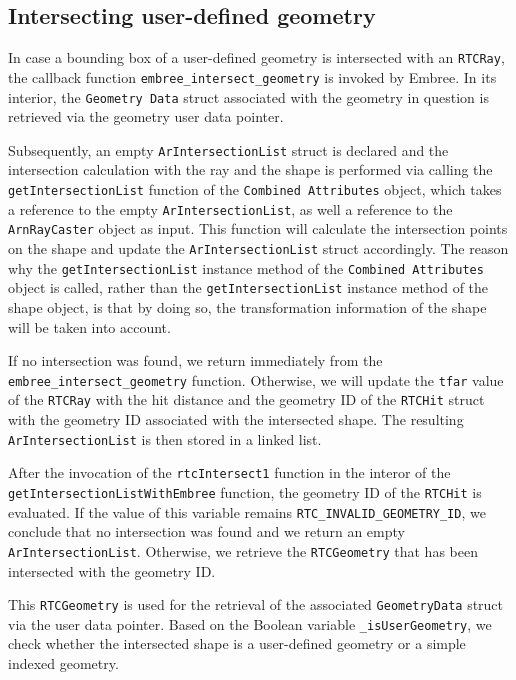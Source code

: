 \subsection{Intersecting user-defined geometry}
\label{subsec:instersect}

In case a bounding box of a user-defined geometry is intersected with an \texttt{RTCRay}, the callback function \texttt{embree\_intersect\_geometry} is invoked by Embree. In its interior, the \texttt{Geometry Data} struct associated with the geometry in question is retrieved via the geometry user data pointer. 

Subsequently, an empty \texttt{ArIntersectionList} struct is declared and the intersection calculation with the ray and the shape is performed via calling the \texttt{getIntersectionList} function of the \texttt{Combined Attributes} object, which takes a reference to the empty \texttt{ArIntersectionList}, as well a reference to the \texttt{ArnRayCaster} object as input.
This function will calculate the intersection points on the shape and update the \texttt{ArIntersectionList} struct accordingly. The reason why the \texttt{getIntersectionList} instance method of the \texttt{Combined Attributes} object is called, rather than the \texttt{getIntersectionList} instance method of the shape object, is that by doing so, the transformation information of the shape will be taken into account.

If no intersection was found, we return immediately from the \texttt{embree\_intersect\_geometry} function. Otherwise, we will update the \texttt{tfar} value of the \texttt{RTCRay} with the hit distance and the geometry ID of the \texttt{RTCHit} struct with the geometry ID associated with the intersected shape.
The resulting \texttt{ArIntersectionList} is then stored in a linked list.

After the invocation of the \texttt{rtcIntersect1} function in the interor of the  \texttt{getIntersectionListWithEmbree} function, the geometry ID of the \texttt{RTCHit} is evaluated. If the value of this variable remains \texttt{RTC\_INVALID\_GEOMETRY\_ID}, we conclude that no intersection was found and we return an empty \texttt{ArIntersectionList}. Otherwise, we retrieve the \texttt{RTCGeometry} that has been intersected with the geometry ID.

This \texttt{RTCGeometry} is used for the retrieval of the associated \texttt{GeometryData} struct via the user data pointer. Based on the Boolean variable \texttt{\_isUserGeometry}, we check whether the intersected shape is a user-defined geometry or a simple indexed geometry.

